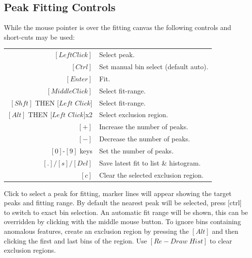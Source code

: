 \documentclass[a4paper,10pt]{article}
\begin{document}
\newpage
\subsection{Peak Fitting Controls}
While the mouse pointer is over the fitting canvas the following controls and short-cuts may be used:
\begin{center}
\begin{tabular}{ r l }
$[Left Click]$ & Select peak.\\
$[Ctrl]$ & Set manual bin select (default auto).\\
$[Enter]$ & Fit.\\
$[Middle Click]$ & Select fit-range.\\
$[Shft]$ THEN $[Left$ $Click]$ & Select fit-range.\\
$[Alt]$ THEN $[Left$ $Click]$x2 & Select exclusion region.\\
$[+]$ & Increase the number of peaks.\\
$[-]$ & Decrease the number of peaks.\\
$[0]$-$[9]$ keys & Set the number of peaks.\\
$[.]/[s]/[Del]$ & Save latest fit to list \& histogram.\\
$[c]$ & Clear the selected exclusion region.\\
\end{tabular}
\end{center}

Click to select a peak for fitting, marker lines will appear showing the target peaks and fitting range. By default the nearest peak will be selected, press $[$ctrl$]$ to switch to exact bin selection. An automatic fit range will be shown, this can be overridden by clicking with the middle mouse button. To ignore bins containing anomalous features, create an exclusion region by pressing the $[Alt]$ and then clicking the first and last bins of the region. Use $[Re-Draw\;Hist]$ to clear exclusion regions.
  
\end{document}
